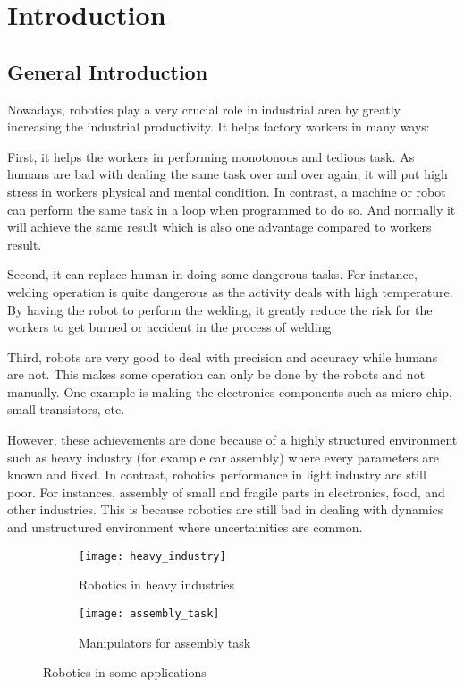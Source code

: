 \chapter{Introduction}
\section{General Introduction}

Nowadays, robotics play a very crucial role in industrial area by greatly increasing the industrial productivity. It helps factory workers in many ways:

First, it helps the workers in performing monotonous and tedious task. As humans are bad with dealing the same task over and over again, it will put high stress in workers physical and mental condition. In contrast, a machine or robot can perform the same task in a loop when programmed to do so. And normally it will achieve the same result which is also one advantage compared to workers result.

Second, it can replace human in doing some dangerous tasks. For instance, welding operation is quite dangerous as the activity deals with high temperature. By having the robot to perform the welding, it greatly reduce the risk for the workers to get burned or accident in the process of welding.

Third, robots are very good to deal with precision and accuracy while humans are not. This makes some operation can only be done by the robots and not manually. One example is making the electronics components such as micro chip, small transistors, etc. 

However, these achievements are done because of a highly structured environment such as heavy industry (for example car assembly) where every parameters are known and fixed. In contrast, robotics performance in light industry are still poor. For instances, assembly of small and fragile parts in electronics, food, and other industries. This is because robotics are still bad in dealing with dynamics and unstructured environment where uncertainities are common. 

\begin{figure}[h]
  \begin{subfigure}[t]{0.5\textwidth}
    \centering
    \texttt{[image: heavy\_industry]} 
    \caption{Robotics in heavy industries}
  \end{subfigure}
  \begin{subfigure}[t]{0.5\textwidth}
    \centering
    \texttt{[image: assembly\_task]}
    \caption{Manipulators for assembly task}
  \end{subfigure}
  \caption{Robotics in some applications}
\end{figure}


